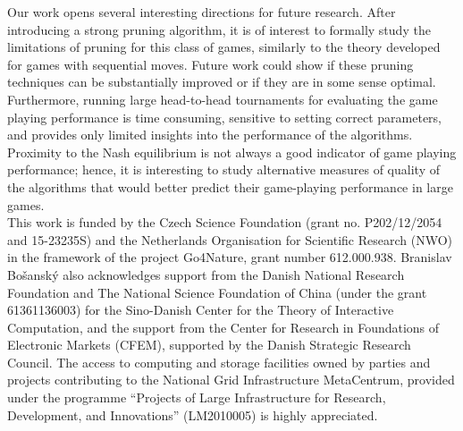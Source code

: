 Our work opens several interesting directions for future research. After introducing a strong pruning algorithm, it is of interest to formally study the limitations of pruning for this class of games, similarly to the theory developed for games with sequential moves. Future work could show if these pruning techniques can be substantially improved or if they are in some sense optimal. 
Furthermore, running large head-to-head tournaments for evaluating the game playing performance is time consuming, sensitive to setting correct parameters, and provides only limited insights into the performance of the algorithms. Proximity to the Nash equilibrium is not always a good indicator of game playing performance; hence, it is interesting to study alternative measures of quality of the algorithms that would better predict their game-playing performance in large games. \\

 This work is funded by the Czech Science Foundation (grant no. P202/12/2054 and 15-23235S) and the Netherlands
Organisation for Scientific Research (NWO) in the framework of the project Go4Nature, grant number 612.000.938.
Branislav Bo{\v s}ansk{\' y} also acknowledges support from the Danish National Research Foundation and The National Science Foundation of China (under the grant 61361136003) for the Sino-Danish Center for the Theory of Interactive Computation, and the support
from the Center for Research in Foundations of Electronic Markets (CFEM), supported by the Danish Strategic Research Council.
The access to computing and storage facilities owned by parties and projects contributing to the National Grid
Infrastructure MetaCentrum, provided under the
programme ``Projects of Large Infrastructure for Research, Development, and Innovations'' (LM2010005) is highly appreciated.


